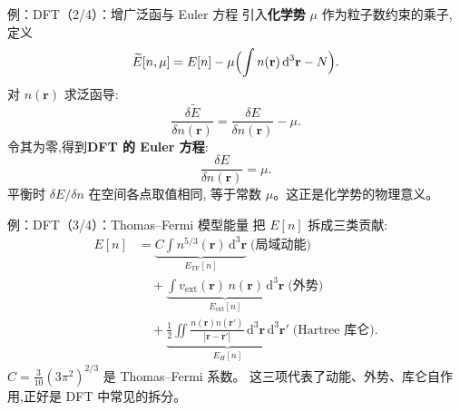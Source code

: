 \documentclass[fontset=windows, chinese, 10pt, xcolor=dvipsnames]{beamer}
\begin{document}
\begin{frame}{例：DFT（2/4）：增广泛函与 Euler 方程}
  引入\textbf{化学势} $\mu$ 作为粒子数约束的乘子,定义
  \begin{equation*}
    \widetilde E[n,\mu] = E[n] - \mu\Bigl(\int n(\mathbf{r})\,\mathrm{d}^3\mathbf{r} - N\Bigr).
  \end{equation*}
  对 $n(\mathbf{r})$ 求泛函导:
  \begin{equation*}
    \frac{\delta\widetilde E}{\delta n(\mathbf{r})}
    = \frac{\delta E}{\delta n(\mathbf{r})} - \mu.
  \end{equation*}
  令其为零,得到\textbf{DFT 的 Euler 方程}:
  \begin{equation*}
    \boxed{\frac{\delta E}{\delta n(\mathbf{r})} = \mu.}
  \end{equation*}
  平衡时 $\delta E/\delta n$ 在空间各点取值相同,
  等于常数 $\mu$。这正是化学势的物理意义。
\end{frame}

\begin{frame}{例：DFT（3/4）：Thomas--Fermi 模型能量}
  把 $E[n]$ 拆成三类贡献:
  \begin{align*}
    E[n] &= \underbrace{C\int n^{5/3}(\mathbf{r})\,\mathrm{d}^3\mathbf{r}}_{E_{\mathrm{TF}}[n]}
           \;\text{(局域动能)}\\
         &\quad+ \underbrace{\int v_{\mathrm{ext}}(\mathbf{r})\,n(\mathbf{r})\,\mathrm{d}^3\mathbf{r}}_{E_{\mathrm{ext}}[n]}
           \;\text{(外势)}\\
         &\quad+ \underbrace{\frac12\iint
            \frac{n(\mathbf{r})n(\mathbf{r}')}{|\mathbf{r}-\mathbf{r}'|}
            \,\mathrm{d}^3\mathbf{r}\,\mathrm{d}^3\mathbf{r}'}_{E_H[n]}
           \;\text{(Hartree 库仑)} .
  \end{align*}
  $C=\frac{3}{10}(3\pi^2)^{2/3}$ 是 Thomas--Fermi 系数。
  这三项代表了动能、外势、库仑自作用,正好是 DFT 中常见的拆分。
\end{frame}
\end{document}

